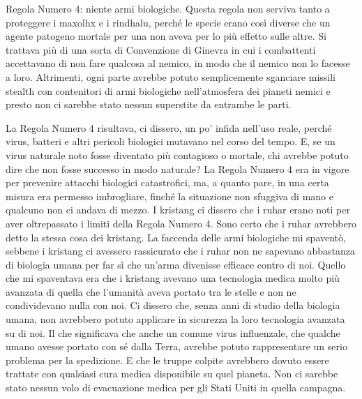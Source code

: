 Regola Numero 4: niente armi biologiche. Questa regola non serviva tanto
a proteggere i maxolhx e i rindhalu, perché le specie erano così diverse
che un agente patogeno mortale per una non aveva per lo più effetto
sulle altre. Si trattava più di una sorta di Convenzione di Ginevra in
cui i combattenti accettavano di non fare qualcosa al nemico, in modo
che il nemico non lo facesse a loro. Altrimenti, ogni parte avrebbe
potuto semplicemente sganciare missili stealth con contenitori di armi
biologiche nell'atmosfera dei pianeti nemici e presto non ci sarebbe
stato nessun superstite da entrambe le parti.

La Regola Numero 4 risultava, ci dissero, un po' infida nell'uso reale,
perché virus, batteri e altri pericoli biologici mutavano nel corso del
tempo. E, se un virus naturale noto fosse diventato più contagioso o
mortale, chi avrebbe potuto dire che non fosse successo in modo
naturale? La Regola Numero 4 era in vigore per prevenire attacchi
biologici catastrofici, ma, a quanto pare, in una certa misura era
permesso imbrogliare, finché la situazione non sfuggiva di mano e
qualcuno non ci andava di mezzo. I kristang ci dissero che i ruhar erano
noti per aver oltrepassato i limiti della Regola Numero 4. Sono certo
che i ruhar avrebbero detto la stessa cosa dei kristang. La faccenda
delle armi biologiche mi spaventò, sebbene i kristang ci avessero
rassicurato che i ruhar non ne sapevano abbastanza di biologia umana per
far sì che un'arma divenisse efficace contro di noi. Quello che mi
spaventava era che i kristang avevano una tecnologia medica molto più
avanzata di quella che l'umanità aveva portato tra le stelle e non ne
condividevano nulla con noi. Ci dissero che, senza anni di studio della
biologia umana, non avrebbero potuto applicare in sicurezza la loro
tecnologia avanzata su di noi. Il che significava che anche un comune
virus influenzale, che qualche umano avesse portato con sé dalla Terra,
avrebbe potuto rappresentare un serio problema per la spedizione. E che
le truppe colpite avrebbero dovuto essere trattate con qualsiasi cura
medica disponibile su quel pianeta. Non ci sarebbe stato nessun volo di
evacuazione medica per gli Stati Uniti in quella campagna.

